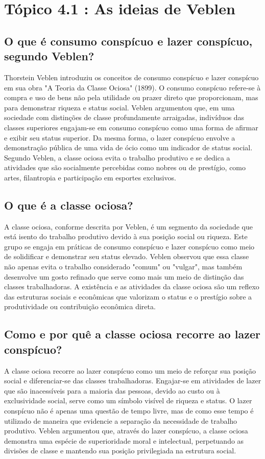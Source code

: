 \documentclass[a4paper,12pt]{article}[abntex2]
\begin{document}
\section{\textbf{Tópico 4.1 : As ideias de Veblen}}
\subsection{\textbf{O que é consumo conspícuo e lazer conspícuo, segundo Veblen?}}
Thorstein Veblen introduziu os conceitos de consumo conspícuo e lazer conspícuo em sua obra "A Teoria da Classe Ociosa" (1899). O consumo conspícuo refere-se à compra e uso de bens não pela utilidade ou prazer direto que proporcionam, mas para demonstrar riqueza e status social. Veblen argumentou que, em uma sociedade com distinções de classe profundamente arraigadas, indivíduos das classes superiores engajam-se em consumo conspícuo como uma forma de afirmar e exibir seu status superior. Da mesma forma, o lazer conspícuo envolve a demonstração pública de uma vida de ócio como um indicador de status social. Segundo Veblen, a classe ociosa evita o trabalho produtivo e se dedica a atividades que são socialmente percebidas como nobres ou de prestígio, como artes, filantropia e participação em esportes exclusivos.
\subsection{\textbf{O que é a classe ociosa?}}
A classe ociosa, conforme descrita por Veblen, é um segmento da sociedade que está isento do trabalho produtivo devido à sua posição social ou riqueza. Este grupo se engaja em práticas de consumo conspícuo e lazer conspícuo como meio de solidificar e demonstrar seu status elevado. Veblen observou que essa classe não apenas evita o trabalho considerado "comum" ou "vulgar", mas também desenvolve um gosto refinado que serve como mais um meio de distinção das classes trabalhadoras. A existência e as atividades da classe ociosa são um reflexo das estruturas sociais e econômicas que valorizam o status e o prestígio sobre a produtividade ou contribuição econômica direta.
\subsection{\textbf{Como e por quê a classe ociosa recorre ao lazer conspícuo?}}
A classe ociosa recorre ao lazer conspícuo como um meio de reforçar sua posição social e diferenciar-se das classes trabalhadoras. Engajar-se em atividades de lazer que são inacessíveis para a maioria das pessoas, devido ao custo ou à exclusividade social, serve como um símbolo visível de riqueza e status. O lazer conspícuo não é apenas uma questão de tempo livre, mas de como esse tempo é utilizado de maneira que evidencie a separação da necessidade de trabalho produtivo. Veblen argumentou que, através do lazer conspícuo, a classe ociosa demonstra uma espécie de superioridade moral e intelectual, perpetuando as divisões de classe e mantendo sua posição privilegiada na estrutura social.
\end{document}
